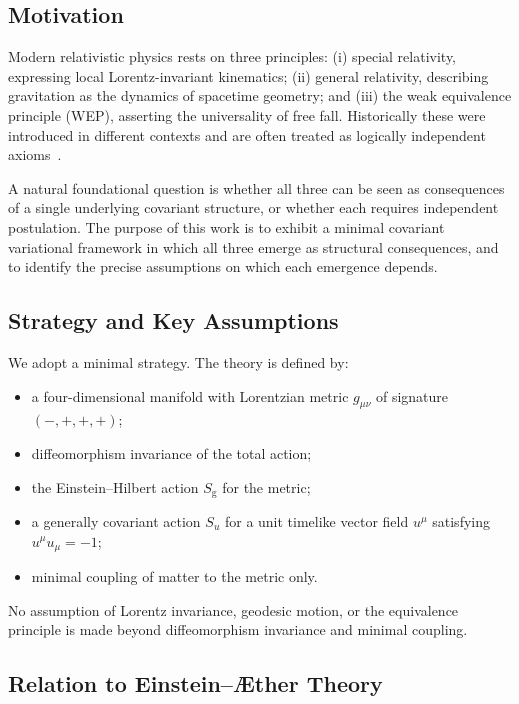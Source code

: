 \documentclass[12pt,a4paper]{article}
\newcommand{\Aether}{\AE ther}
\newcommand{\EH}{S_{\mathrm{g}}}
\newcommand{\Su}{S_{u}}
\begin{document}
\subsection{Motivation}

Modern relativistic physics rests on three principles: (i) special relativity,
expressing local Lorentz-invariant kinematics; (ii) general relativity,
describing gravitation as the dynamics of spacetime geometry; and (iii) the
weak equivalence principle (WEP), asserting the universality of free fall.
Historically these were introduced in different contexts and are often treated
as logically independent axioms~\citep{will2014,einstein1905,einstein1915}.

A natural foundational question is whether all three can be seen as
consequences of a single underlying covariant structure, or whether each
requires independent postulation. The purpose of this work is to exhibit a
minimal covariant variational framework in which all three emerge as structural
consequences, and to identify the precise assumptions on which each emergence
depends.

\subsection{Strategy and Key Assumptions}
\label{sec:assumptions}


We adopt a minimal strategy. The theory is defined by:
\begin{itemize}[noitemsep]
  \item a four-dimensional manifold with Lorentzian metric $g_{\mu\nu}$
        of signature $(-,+,+,+)$;
  \item diffeomorphism invariance of the total action;
  \item the Einstein--Hilbert action $\EH$ for the metric;
  \item a generally covariant action $\Su$ for a unit timelike vector field
        $u^{\mu}$ satisfying $u^{\mu}u_{\mu}=-1$;
  \item minimal coupling of matter to the metric only.
\end{itemize}
No assumption of Lorentz invariance, geodesic motion, or the equivalence
principle is made beyond diffeomorphism invariance and minimal coupling.

\subsection{Relation to Einstein--\texorpdfstring{\Aether}{AEther} Theory}
\label{sec:aether}
\end{document}
